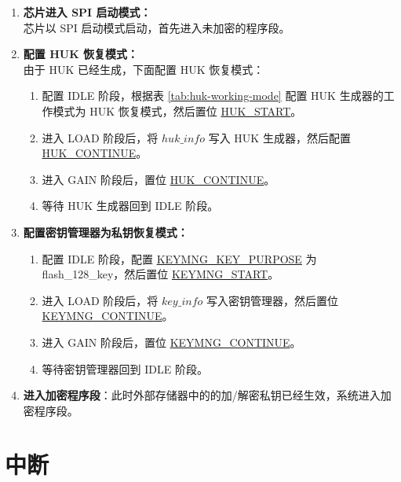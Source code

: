 \documentclass[main\_\_CN.tex]{subfiles}
\begin{document}
\begin{enumerate}
    \item \textbf{芯片进入 SPI 启动模式：}\\
    芯片以 SPI 启动模式启动，首先进入未加密的程序段。
    \item \textbf{配置 HUK 恢复模式：}\\
    由于 HUK 已经生成，下面配置 HUK 恢复模式：
    \begin{enumerate}
        \item 配置 IDLE 阶段，根据表 \ref{tab:huk-working-mode} 配置 HUK 生成器的工作模式为 HUK 恢复模式，然后置位 \hyperref[fielddesc:HUKSTART]{HUK\_START}。
        \item 进入 LOAD 阶段后，将 \hyperref[para:hukinfo]{\begin{math}huk\_info\end{math}} 写入 HUK 生成器，然后配置 \hyperref[fielddesc:HUKCONTINUE]{HUK\_CONTINUE}。
        \item 进入 GAIN 阶段后，置位 \hyperref[fielddesc:HUKCONTINUE]{HUK\_CONTINUE}。
        \item 等待 HUK 生成器回到 IDLE 阶段。
    \end{enumerate}
    \item \textbf{配置密钥管理器为私钥恢复模式：}
    \begin{enumerate}
        \item 配置 IDLE 阶段，配置  \hyperref[fielddesc:KEYMNGKEYPURPOSE]{KEYMNG\_KEY\_PURPOSE} 为 flash\_128\_key，然后置位 \hyperref[fielddesc:KEYMNGSTART]{KEYMNG\_START}。
        \item 进入 LOAD 阶段后，将 \hyperref[para:keyinfo]{\begin{math}key\_info\end{math}} 写入密钥管理器，然后置位 \hyperref[fielddesc:KEYMNGCONTINUE]{KEYMNG\_CONTINUE}。
        \item 进入 GAIN 阶段后，置位 \hyperref[fielddesc:KEYMNGCONTINUE]{KEYMNG\_CONTINUE}。
        \item 等待密钥管理器回到 IDLE 阶段。
    \end{enumerate}
    \item \textbf{进入加密程序段}：此时外部存储器中的的加/解密私钥已经生效，系统进入加密程序段。
\end{enumerate}

\section{中断}
\end{document}
